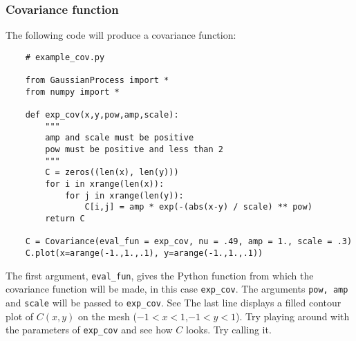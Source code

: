 \documentclass{report}
\begin{document}
\subsubsection{Covariance function} 
The following code will produce a covariance function:
\begin{small}
\begin{verbatim}
    # example_cov.py
    
    from GaussianProcess import *
    from numpy import *

    def exp_cov(x,y,pow,amp,scale):
        """
        amp and scale must be positive
        pow must be positive and less than 2
        """
        C = zeros((len(x), len(y)))
        for i in xrange(len(x)):
            for j in xrange(len(y)):
                C[i,j] = amp * exp(-(abs(x-y) / scale) ** pow)
        return C

    C = Covariance(eval_fun = exp_cov, nu = .49, amp = 1., scale = .3)
    C.plot(x=arange(-1.,1.,.1), y=arange(-1.,1.,.1))
\end{verbatim}
\end{small}
The first argument, \texttt{eval\_fun}, gives the Python function from which the covariance function will be made, in this case \texttt{exp\_cov}. The arguments \texttt{pow, amp} and \texttt{scale} will be passed to \texttt{exp\_cov}. See The last line displays a filled contour plot of $C(x,y)$ on the mesh ($-1<x<1$,$-1<y<1$). Try playing around with the parameters of \texttt{exp\_cov} and see how $C$ looks. Try calling it.
\end{document}
